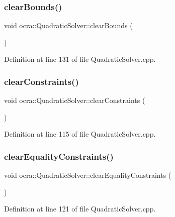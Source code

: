 \subsubsection{\texorpdfstring{clear\+Bounds()}{clearBounds()}}
{\footnotesize\ttfamily void ocra\+::\+Quadratic\+Solver\+::clear\+Bounds (\begin{DoxyParamCaption}{ }\end{DoxyParamCaption})}



Definition at line 131 of file Quadratic\+Solver.\+cpp.

\hypertarget{classocra_1_1QuadraticSolver_a0799e2cf2d10be123e5dcdf43e1fcaba}{}\label{classocra_1_1QuadraticSolver_a0799e2cf2d10be123e5dcdf43e1fcaba} 
\subsubsection{\texorpdfstring{clear\+Constraints()}{clearConstraints()}}
{\footnotesize\ttfamily void ocra\+::\+Quadratic\+Solver\+::clear\+Constraints (\begin{DoxyParamCaption}{ }\end{DoxyParamCaption})}



Definition at line 115 of file Quadratic\+Solver.\+cpp.

\hypertarget{classocra_1_1QuadraticSolver_a5e9a6e51657e775ab6619e86814982cc}{}\label{classocra_1_1QuadraticSolver_a5e9a6e51657e775ab6619e86814982cc} 
\subsubsection{\texorpdfstring{clear\+Equality\+Constraints()}{clearEqualityConstraints()}}
{\footnotesize\ttfamily void ocra\+::\+Quadratic\+Solver\+::clear\+Equality\+Constraints (\begin{DoxyParamCaption}{ }\end{DoxyParamCaption})}



Definition at line 121 of file Quadratic\+Solver.\+cpp.

